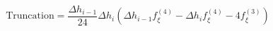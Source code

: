 \begin{equation} 
\text{Truncation} = \frac{\Delta h_{{i-1}}}{24} \Delta h_{{i}} \left(\Delta h_{{i-1}} f^{{(4)}}_{{\xi}} - \Delta h_{{i}} f^{{(4)}}_{{\xi}} - 4 f^{{(3)}}_{{\xi}}\right)
 \end{equation}